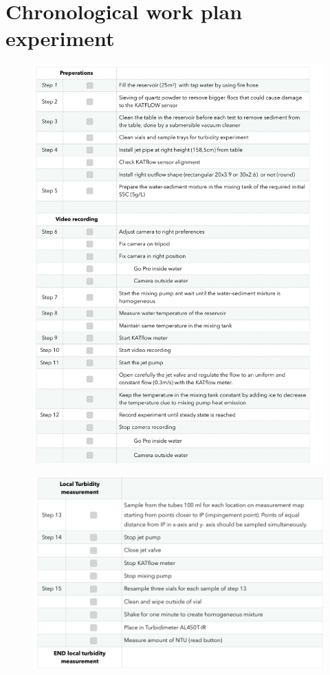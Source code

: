 \chapter{Chronological work plan experiment}
\label{app:work_plan}

\begin{figure}[ht!]
    \centering
    \includegraphics[width=1\linewidth]{Images/Workplan_3_1.png}
\end{figure}

\begin{figure}[ht!]
    \centering
    \includegraphics[width=\linewidth]{Images/Workplan_3_2.png}
\end{figure}